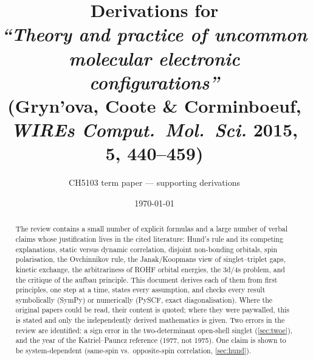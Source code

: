 \documentclass[11pt,a4paper]{article}
\title{Derivations for\\ \emph{``Theory and practice of uncommon molecular electronic configurations''}\\
\large (Gryn'ova, Coote \& Corminboeuf, \emph{WIREs Comput.\ Mol.\ Sci.} \textbf{2015}, 5, 440--459)}
\author{CH5103 term paper --- supporting derivations}
\date{\today}
\numberwithin{equation}{section}
\begin{document}
\maketitle

\begin{abstract}
The review contains a small number of explicit formulas and a large number of verbal claims whose
justification lives in the cited literature: Hund's rule and its competing explanations, static
versus dynamic correlation, disjoint non-bonding orbitals, spin polarisation, the Ovchinnikov rule,
the Janak/Koopmans view of singlet--triplet gaps, kinetic exchange, the arbitrariness of ROHF orbital
energies, the 3d/4s problem, and the critique of the aufbau principle. This document derives each
of them from first principles, one step at a time, states every assumption, and checks every
result symbolically (SymPy) or numerically (PySCF, exact diagonalisation). Where the original papers
could be read, their content is quoted; where they were paywalled, this is stated and only the
independently derived mathematics is given. Two errors in the review are identified: a sign error
in the two-determinant open-shell singlet (\cref{sec:twoe}), and the year of the Katriel--Pauncz
reference (1977, not 1975). One claim is shown to be system-dependent (same-spin vs.\ opposite-spin
correlation, \cref{sec:hund}).
\end{abstract}

\tableofcontents
\newpage

\setcounter{section}{-1}%


















\end{document}
